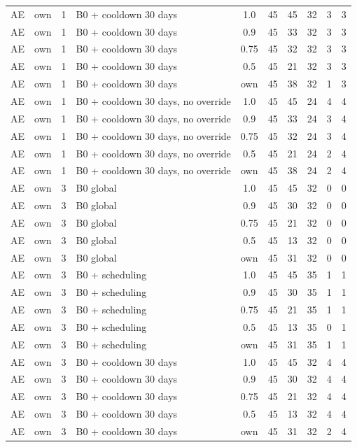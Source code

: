 \begin{longtable}{lllp{4.4cm}cccccc}
AE & own & 1 & B0 + cooldown 30 days & 1.0 & 45 & 45 & 32 & 3 & 3 \\
AE & own & 1 & B0 + cooldown 30 days & 0.9 & 45 & 33 & 32 & 3 & 3 \\
AE & own & 1 & B0 + cooldown 30 days & 0.75 & 45 & 32 & 32 & 3 & 3 \\
AE & own & 1 & B0 + cooldown 30 days & 0.5 & 45 & 21 & 32 & 3 & 3 \\
AE & own & 1 & B0 + cooldown 30 days & own & 45 & 38 & 32 & 1 & 3 \\
AE & own & 1 & B0 + cooldown 30 days, no override & 1.0 & 45 & 45 & 24 & 4 & 4 \\
AE & own & 1 & B0 + cooldown 30 days, no override & 0.9 & 45 & 33 & 24 & 3 & 4 \\
AE & own & 1 & B0 + cooldown 30 days, no override & 0.75 & 45 & 32 & 24 & 3 & 4 \\
AE & own & 1 & B0 + cooldown 30 days, no override & 0.5 & 45 & 21 & 24 & 2 & 4 \\
AE & own & 1 & B0 + cooldown 30 days, no override & own & 45 & 38 & 24 & 2 & 4 \\
AE & own & 3 & B0 global & 1.0 & 45 & 45 & 32 & 0 & 0 \\
AE & own & 3 & B0 global & 0.9 & 45 & 30 & 32 & 0 & 0 \\
AE & own & 3 & B0 global & 0.75 & 45 & 21 & 32 & 0 & 0 \\
AE & own & 3 & B0 global & 0.5 & 45 & 13 & 32 & 0 & 0 \\
AE & own & 3 & B0 global & own & 45 & 31 & 32 & 0 & 0 \\
AE & own & 3 & B0 + scheduling & 1.0 & 45 & 45 & 35 & 1 & 1 \\
AE & own & 3 & B0 + scheduling & 0.9 & 45 & 30 & 35 & 1 & 1 \\
AE & own & 3 & B0 + scheduling & 0.75 & 45 & 21 & 35 & 1 & 1 \\
AE & own & 3 & B0 + scheduling & 0.5 & 45 & 13 & 35 & 0 & 1 \\
AE & own & 3 & B0 + scheduling & own & 45 & 31 & 35 & 1 & 1 \\
AE & own & 3 & B0 + cooldown 30 days & 1.0 & 45 & 45 & 32 & 4 & 4 \\
AE & own & 3 & B0 + cooldown 30 days & 0.9 & 45 & 30 & 32 & 4 & 4 \\
AE & own & 3 & B0 + cooldown 30 days & 0.75 & 45 & 21 & 32 & 4 & 4 \\
AE & own & 3 & B0 + cooldown 30 days & 0.5 & 45 & 13 & 32 & 4 & 4 \\
AE & own & 3 & B0 + cooldown 30 days & own & 45 & 31 & 32 & 2 & 4 \\

\end{longtable}
